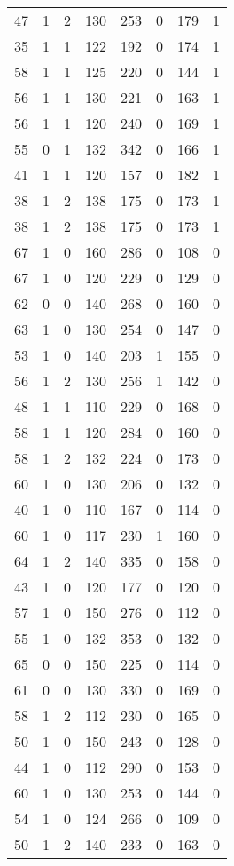 \documentclass{article}
\begin{document}
\begin{longtable}{*{8}{c}}
47 & 1 & 2 & 130 & 253 & 0 & 179 & 1 \\
35 & 1 & 1 & 122 & 192 & 0 & 174 & 1 \\
58 & 1 & 1 & 125 & 220 & 0 & 144 & 1 \\
56 & 1 & 1 & 130 & 221 & 0 & 163 & 1 \\
56 & 1 & 1 & 120 & 240 & 0 & 169 & 1 \\
55 & 0 & 1 & 132 & 342 & 0 & 166 & 1 \\
41 & 1 & 1 & 120 & 157 & 0 & 182 & 1 \\
38 & 1 & 2 & 138 & 175 & 0 & 173 & 1 \\
38 & 1 & 2 & 138 & 175 & 0 & 173 & 1 \\
67 & 1 & 0 & 160 & 286 & 0 & 108 & 0 \\
67 & 1 & 0 & 120 & 229 & 0 & 129 & 0 \\
62 & 0 & 0 & 140 & 268 & 0 & 160 & 0 \\
63 & 1 & 0 & 130 & 254 & 0 & 147 & 0 \\
53 & 1 & 0 & 140 & 203 & 1 & 155 & 0 \\
56 & 1 & 2 & 130 & 256 & 1 & 142 & 0 \\
48 & 1 & 1 & 110 & 229 & 0 & 168 & 0 \\
58 & 1 & 1 & 120 & 284 & 0 & 160 & 0 \\
58 & 1 & 2 & 132 & 224 & 0 & 173 & 0 \\
60 & 1 & 0 & 130 & 206 & 0 & 132 & 0 \\
40 & 1 & 0 & 110 & 167 & 0 & 114 & 0 \\
60 & 1 & 0 & 117 & 230 & 1 & 160 & 0 \\
64 & 1 & 2 & 140 & 335 & 0 & 158 & 0 \\
43 & 1 & 0 & 120 & 177 & 0 & 120 & 0 \\
57 & 1 & 0 & 150 & 276 & 0 & 112 & 0 \\
55 & 1 & 0 & 132 & 353 & 0 & 132 & 0 \\
65 & 0 & 0 & 150 & 225 & 0 & 114 & 0 \\
61 & 0 & 0 & 130 & 330 & 0 & 169 & 0 \\
58 & 1 & 2 & 112 & 230 & 0 & 165 & 0 \\
50 & 1 & 0 & 150 & 243 & 0 & 128 & 0 \\
44 & 1 & 0 & 112 & 290 & 0 & 153 & 0 \\
60 & 1 & 0 & 130 & 253 & 0 & 144 & 0 \\
54 & 1 & 0 & 124 & 266 & 0 & 109 & 0 \\
50 & 1 & 2 & 140 & 233 & 0 & 163 & 0 \\

\end{longtable}
\end{document}
